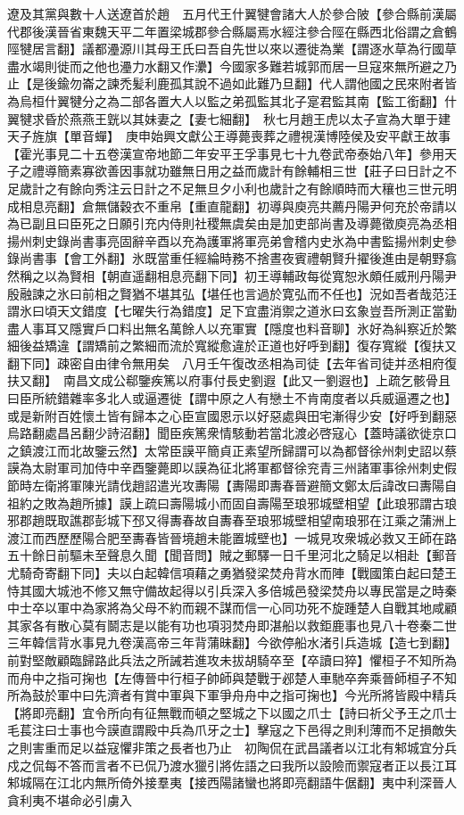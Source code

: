 遼及其黨與數十人送遼首於趙　五月代王什翼犍會諸大人於參合陂【參合縣前漢屬代郡後漢晉省東魏天平二年置梁城郡參合縣屬焉水經注參合陘在縣西北俗謂之倉鶴陘犍居言翻】議都灅源川其母王氏曰吾自先世以來以遷徙為業【謂逐水草為行國草盡水竭則徙而之他也灅力水翻又作㶟】今國家多難若城郭而居一旦寇來無所避之乃止【是後鍮勿崙之諫禿髪利鹿孤其說不過如此難乃旦翻】代人謂他國之民來附者皆為烏桓什翼犍分之為二部各置大人以監之弟孤監其北子寔君監其南【監工銜翻】什翼犍求昏於燕燕王皝以其妹妻之【妻七細翻】　秋七月趙王虎以太子宣為大單于建天子旌旗【單音蟬】　庚申始興文獻公王導薨喪葬之禮視漢博陸侯及安平獻王故事【霍光事見二十五卷漢宣帝地節二年安平王孚事見七十九卷武帝泰始八年】參用天子之禮導簡素寡欲善因事就功雖無日用之益而歲計有餘輔相三世【莊子曰日計之不足歲計之有餘向秀注云日計之不足無旦夕小利也歲計之有餘順時而大穰也三世元明成相息亮翻】倉無儲穀衣不重帛【重直龍翻】初導與庾亮共薦丹陽尹何充於帝請以為已副且曰臣死之日願引充内侍則社稷無虞矣由是加吏部尚書及導薨徵庾亮為丞相揚州刺史錄尚書事亮固辭辛酉以充為護軍將軍亮弟會稽内史氷為中書監揚州刺史參錄尚書事【會工外翻】氷既當重任經綸時務不捨晝夜賓禮朝賢升擢後進由是朝野翕然稱之以為賢相【朝直遥翻相息亮翻下同】初王導輔政每從寬恕氷頗任威刑丹陽尹殷融諫之氷曰前相之賢猶不堪其弘【堪任也言過於寛弘而不任也】況如吾者哉范汪謂氷曰頃天文錯度【七曜失行為錯度】足下宜盡消禦之道氷曰玄象豈吾所測正當勤盡人事耳又隱實戶口料出無名萬餘人以充軍實【隱度也料音聊】氷好為糾察近於繁細後益矯違【謂矯前之繁細而流於寬縱愈違於正道也好呼到翻】復存寬縱【復扶又翻下同】疎密自由律令無用矣　八月壬午復改丞相為司徒【去年省司徒并丞相府復扶又翻】　南昌文成公郗鑒疾篤以府事付長史劉遐【此又一劉遐也】上疏乞骸骨且曰臣所統錯雜率多北人或逼遷徙【謂中原之人有戀土不肯南度者以兵威逼遷之也】或是新附百姓懷土皆有歸本之心臣宣國恩示以好惡處與田宅漸得少安【好呼到翻惡烏路翻處昌呂翻少詩沼翻】聞臣疾篤衆情駭動若當北渡必啓寇心【蓋時議欲徙京口之鎮渡江而北故鑒云然】太常臣謨平簡貞正素望所歸謂可以為都督徐州刺史詔以蔡謨為太尉軍司加侍中辛酉鑒薨即以謨為征北將軍都督徐兖青三州諸軍事徐州刺史假節時左衛將軍陳光請伐趙詔遣光攻夀陽【夀陽即夀春晉避簡文鄭太后諱改曰夀陽自祖約之敗為趙所據】謨上疏曰壽陽城小而固自壽陽至琅邪城壁相望【此琅邪謂古琅邪郡趙既取譙郡彭城下邳又得夀春故自夀春至琅邪城壁相望南琅邪在江乘之蒲洲上渡江而西歷歷陽合肥至夀春皆晉境趙未能置城壁也】一城見攻衆城必救又王師在路五十餘日前驅未至聲息久聞【聞音問】賊之郵驛一日千里河北之騎足以相赴【郵音尤騎奇寄翻下同】夫以白起韓信項藉之勇猶發梁焚舟背水而陣【戰國策白起曰楚王恃其國大城池不修又無守備故起得以引兵深入多倍城邑發梁焚舟以專民當是之時秦中士卒以軍中為家將為父母不約而親不謀而信一心同功死不旋踵楚人自戰其地咸顧其家各有散心莫有鬬志是以能有功也項羽焚舟即湛船以救鉅鹿事也見八十卷秦二世三年韓信背水事見九卷漢高帝三年背蒲昧翻】今欲停船水渚引兵造城【造七到翻】前對堅敵顧臨歸路此兵法之所誡若進攻未拔胡騎卒至【卒讀曰猝】懼桓子不知所為而舟中之指可掬也【左傳晉中行桓子帥師與楚戰于邲楚人車馳卒奔乘晉師桓子不知所為鼓於軍中曰先濟者有賞中軍與下軍爭舟舟中之指可掬也】今光所將皆殿中精兵【將即亮翻】宜令所向有征無戰而頓之堅城之下以國之爪士【詩曰祈父予王之爪士毛萇注曰士事也今謨直謂殿中兵為爪牙之士】擊寇之下邑得之則利薄而不足損敵失之則害重而足以益寇懼非策之長者也乃止　初陶侃在武昌議者以江北有邾城宜分兵戍之侃每不答而言者不已侃乃渡水獵引將佐語之曰我所以設險而禦寇者正以長江耳邾城隔在江北内無所倚外接羣夷【接西陽諸蠻也將即亮翻語牛倨翻】夷中利深晉人貪利夷不堪命必引虜入